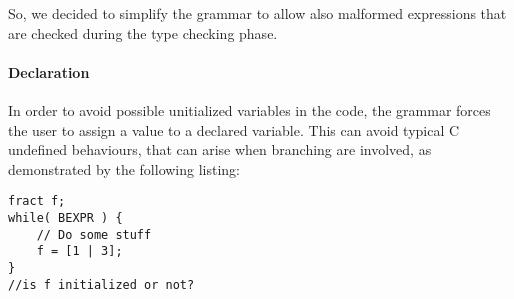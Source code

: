So, we decided to simplify the grammar to allow also malformed expressions that
are checked during the type checking phase.


\paragraph{Declaration}

In order to avoid possible unitialized variables in the code, the grammar 
forces the user to assign a value to a declared variable. This can avoid
typical C undefined behaviours, that can arise when branching are involved, as
demonstrated by the following listing:
\begin{verbatim}
fract f;
while( BEXPR ) {
    // Do some stuff
    f = [1 | 3];
}
//is f initialized or not?
\end{verbatim}
